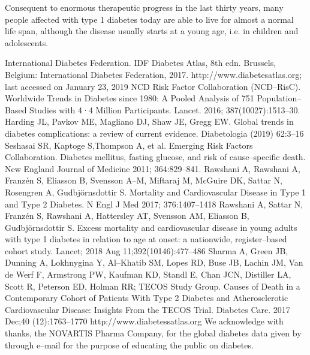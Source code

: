 Consequent to enormous therapeutic progress in the last thirty years, many people affected with type 1 diabetes today are able to live for almost a normal life span, although the disease usually starts at a young age, i.e. in children and adolescents.

\begin{thebibliography}{99}
 International Diabetes Federation. IDF Diabetes Atlas, 8th edn. Brussels, Belgium: International Diabetes Federation, 2017. http://www.diabetesatlas.org; last accessed on January 23, 2019
  NCD Risk Factor Collaboration (NCD–RisC). Worldwide Trends in Diabetes since 1980: A Pooled Analysis of 751 Population–Based Studies with 4·4 Million Participants. Lancet. 2016; 387(10027):1513–30.
  Harding JL, Pavkov ME, Magliano DJ, Shaw JE, Gregg EW. Global trends in diabetes complications: a review of current evidence. Diabetologia (2019) 62:3–16
  Seshasai SR, Kaptoge S,Thompson A, et al. Emerging Risk Fa\-ctors Collaboration. Diabetes mellitus, fasting glucose, and risk of cause–specific death. New England Journal of Medicine 2011; 364:829–841.
  Rawshani A, Rawshani A, Franzén S, Eliasson B, Svensson A–M, Miftaraj M, McGuire DK, Sattar N, Rosengren A, Gudbjörnsdottir S. Mortality and Cardiovascular Disease in Type 1 and Type 2 Diabetes. N Engl J Med 2017; 376:1407–1418
  Rawshani A, Sattar N, Franzén S, Rawshani A, Hattersley AT, Svensson AM, Eliasson B, Gudbjörnsdottir S. Excess mortality and cardiovascular disease in young adults with type 1 diabetes in rela\-tion to age at onset: a nationwide, register–based cohort study. Lancet; 2018 Aug 11;392(10146):477–486
  Sharma A, Green JB, Dunning A, Lokhnygina Y, Al–Khatib SM, Lopes RD, Buse JB, Lachin JM, Van de Werf F, Armstrong PW, Kaufman KD, Standl E, Chan JCN, Distiller LA, Scott R, Peterson ED, Holman RR; TECOS Study Group. Causes of Death in a Contemporary Cohort of Patients With Type 2 Diabetes and Atherosclerotic Cardiovascular Disease: Insights From the TECOS Trial. Diabetes Care. 2017 Dec;40 (12):1763–1770
  http://www.diabetessatlas.org
  We acknowledge with thanks, the NOVARTIS Pharma Company, for the global diabetes data given by through e–mail for the purpose of educating the public on diabetes.
 \end{thebibliography}





